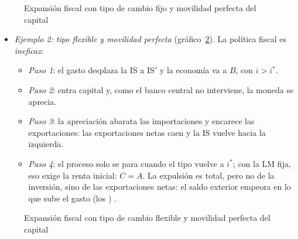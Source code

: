 \documentclass[11pt]{article}
\begin{document}
\begin{figure}[H]
\centering
\caption{Expansión fiscal con tipo de cambio fijo y movilidad perfecta del capital}\label{fig:mf-fijo-perfecta}
\end{figure}

\begin{itemize}
\item \emph{Ejemplo 2: tipo flexible y movilidad perfecta} (gráfico~\ref{fig:mf-flexible-perfecta}). La política fiscal es \emph{ineficaz}:
  \begin{itemize}
  \item \emph{Paso 1}: el gasto desplaza la IS a IS$'$ y la economía va a $B$, con $i>i^*$.
  \item \emph{Paso 2}: entra capital y, como el banco central no interviene, la moneda se aprecia.
  \item \emph{Paso 3}: la apreciación abarata las importaciones y encarece las exportaciones: las exportaciones netas caen y la IS vuelve hacia la izquierda.
  \item \emph{Paso 4}: el proceso solo se para cuando el tipo vuelve a $i^*$; con la LM fija, eso exige la renta inicial: $C=A$. La expulsión es total, pero no de la inversión, sino de las exportaciones netas: el saldo exterior empeora en lo que sube el gasto (los ) .
  \end{itemize}
\end{itemize}

\begin{figure}[H]
\centering
\caption{Expansión fiscal con tipo de cambio flexible y movilidad perfecta del capital}\label{fig:mf-flexible-perfecta}
\end{figure}
\end{document}

